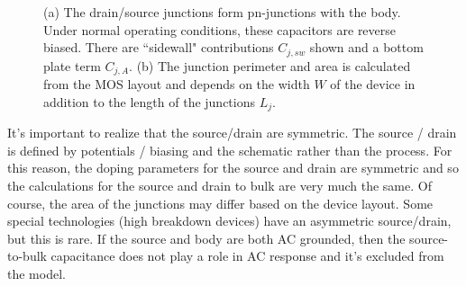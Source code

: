 \begin{figure}[tb]
\begin{center}
\end{center}
\caption{(a) The drain/source junctions form pn-junctions with the body.  Under normal operating conditions, these capacitors are reverse biased.  There are ``sidewall" contributions $C_{j,sw}$ shown and a bottom plate term $C_{j,A}$.  (b)  The junction perimeter and area is calculated from the MOS layout and depends on the width $W$ of the device in addition to the length of the junctions $L_j$.} 
\end{figure}

It's important to realize that the source/drain are symmetric.  The source / drain is defined by potentials / biasing and the schematic rather than the process. For this reason, the doping parameters for the source and drain are symmetric and so the calculations for the source and drain to bulk are very much the same.  Of course, the area of the junctions may differ based on the device layout.	Some special technologies (high breakdown devices) have an asymmetric source/drain, but this is rare.	 If the source and body are both AC grounded, then the source-to-bulk capacitance does not play a role in AC response and it's excluded from the model.
